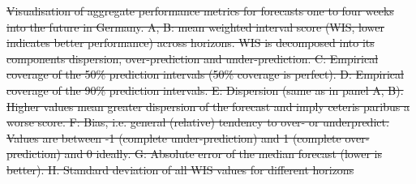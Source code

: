 \documentclass[10pt,letterpaper]{article}
\providecommand{\DIFdeltex}[1]{{\protect\color{red}\sout{#1}}}                      %
\providecommand{\DIFdelFL}[1]{\DIFdel{#1}} %
\providecommand{\DIFdel}[1]{\texorpdfstring{\DIFdeltex{#1}}{}} %
\begin{document}
{%
\DIFdelFL{Visualisation of aggregate performance metrics for forecasts one to four weeks into the future in Germany. A, B: mean weighted interval score (WIS, lower indicates better performance) across horizons. WIS is decomposed into its components dispersion, over-prediction and under-prediction. C: Empirical coverage of the 50\% prediction intervals (50\% coverage is perfect). D: Empirical coverage of the 90\% prediction intervals. E: Dispersion (same as in panel A, B). Higher values mean greater dispersion of the forecast and imply ceteris paribus a worse score. F: Bias, i.e. general (relative) tendency to over- or underpredict. Values are between -1 (complete under-prediction) and 1 (complete over-prediction) and 0 ideally. G: Absolute error of the median forecast (lower is better). H. Standard deviation of all WIS values for different horizons}}%

\end{document}
